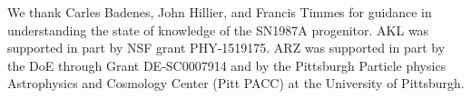 \documentclass[nofootinbib,prd,superscriptaddress,twocolumn]{revtex4}
\begin{document}
\acknowledgments

We thank Carles Badenes, John Hillier, and Francis Timmes for guidance in understanding 
the state of knowledge of the SN1987A progenitor. 
AKL was supported in part by NSF grant PHY-1519175. 
ARZ was supported in part by the DoE through Grant DE-SC0007914 and by 
the Pittsburgh Particle physics Astrophysics and Cosmology Center (Pitt PACC) 
at the University of Pittsburgh.


\end{document}
